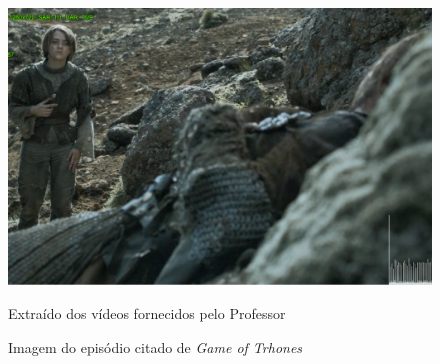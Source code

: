 \begin{figure}[H]
    \centering
    \caption{Imagem do episódio citado de \textit{Game of Trhones}}
    \label{fig:imagem24}
    
    \includegraphics[scale=0.3]{Documeto/1-ElementosTextuais/images/24.png}

    \small
    Extraído dos vídeos fornecidos pelo Professor
\end{figure}